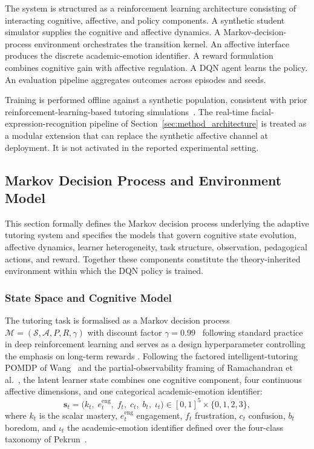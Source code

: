 The system is structured as a reinforcement learning architecture consisting of interacting cognitive, affective, and policy components. A synthetic student simulator supplies the cognitive and affective dynamics. A Markov-decision-process environment orchestrates the transition kernel. An affective interface produces the discrete academic-emotion identifier. A reward formulation combines cognitive gain with affective regulation. A \ac{DQN} agent learns the policy. An evaluation pipeline aggregates outcomes across episodes and seeds.

Training is performed offline against a synthetic population, consistent with prior reinforcement-learning-based tutoring simulations~\cite{guzman_developing_2025,kong_real-time_2025}. The real-time facial-expression-recognition pipeline of Section~\ref{sec:method_architecture} is treated as a modular extension that can replace the synthetic affective channel at deployment. It is not activated in the reported experimental setting.\label{sec:method_rl_formulation}

\subsection{Markov Decision Process and Environment Model}\label{sec:method_rl_mdp_parent}

This section formally defines the Markov decision process underlying the adaptive tutoring system and specifies the models that govern cognitive state evolution, affective dynamics, learner heterogeneity, task structure, observation, pedagogical actions, and reward. Together these components constitute the theory-inherited environment within which the \ac{DQN} policy is trained.

\subsubsection{State Space and Cognitive Model}\label{sec:method_mdp}

The tutoring task is formalised as a Markov decision process $\mathcal{M} = (\mathcal{S}, \mathcal{A}, P, R, \gamma)$ with discount factor $\gamma = 0.99$~ following standard practice in deep reinforcement learning and serves as a design hyperparameter controlling the emphasis on long-term rewards \cite{mnih_dqn_2015}. Following the factored intelligent-tutoring \ac{POMDP} of Wang~\cite{wang_factored_pomdp_2018} and the partial-observability framing of Ramachandran et al.~\cite{ramachandran_pomdp_2018}, the latent learner state combines one cognitive component, four continuous affective dimensions, and one categorical academic-emotion identifier:
\begin{equation}
    \mathbf{s}_t = \bigl(k_t,\; e^\mathrm{eng}_t,\; f_t,\; c_t,\; b_t,\; \iota_t\bigr) \in [0,1]^5 \times \{0,1,2,3\},
    \label{eq:student_state}
\end{equation}
where $k_t$ is the scalar mastery, $e^\mathrm{eng}_t$ engagement, $f_t$ frustration, $c_t$ confusion, $b_t$ boredom, and $\iota_t$ the academic-emotion identifier defined over the four-class taxonomy of Pekrun~\cite{pekrun_control-value_2006}.


